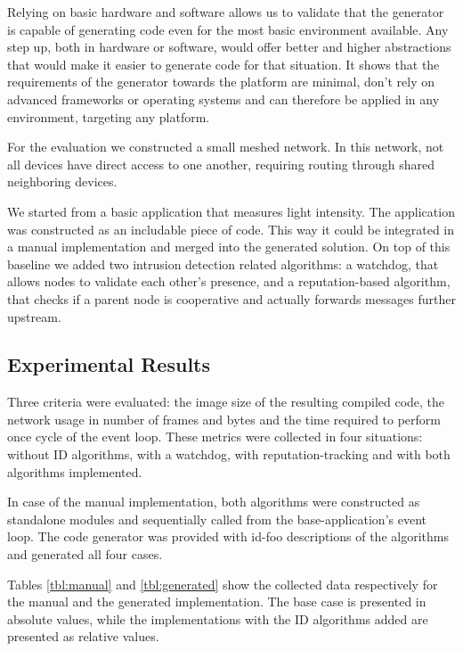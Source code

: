 \documentclass[conference]{IEEEtran}
\newcommand{\NAME}{id-foo\xspace}
\begin{document}
Relying on basic hardware and software allows us to validate that the generator
is capable of generating code even for the most basic environment available.
Any step up, both in hardware or software, would offer better and higher
abstractions that would make it easier to generate code for that situation. It
shows that the requirements of the generator towards the platform are minimal,
don't rely on advanced frameworks or operating systems and can therefore be
applied in any environment, targeting any platform.

For the evaluation we constructed a small meshed network. In this network, not
all devices have direct access to one another, requiring routing through shared
neighboring devices.

We started from a basic application that measures light intensity. The
application was constructed as an includable piece of code. This way it could
be integrated in a manual implementation and merged into the generated
solution. On top of this baseline we added two intrusion detection related
algorithms: a watchdog\cite{mishra2004intrusion}, that allows nodes to validate
each other's presence, and a reputation-based
algorithm\cite{ganeriwal2008reputation}, that checks if a parent node is
cooperative and actually forwards messages further upstream.

\subsection*{Experimental Results}

Three criteria were evaluated: the image size of the resulting compiled code,
the network usage in number of frames and bytes and the time required to
perform once cycle of the event loop. These metrics were collected in four
situations: without ID algorithms, with a watchdog, with reputation-tracking
and with both algorithms implemented.

In case of the manual implementation, both algorithms were constructed as
standalone modules and sequentially called from the base-application's event
loop. The code generator was provided with \NAME descriptions of the algorithms
and generated all four cases.

Tables \ref{tbl:manual} and \ref{tbl:generated} show the collected data
respectively for the manual and the generated implementation. The base case is
presented in absolute values, while the implementations with the ID algorithms
added are presented as relative values.
\end{document}
